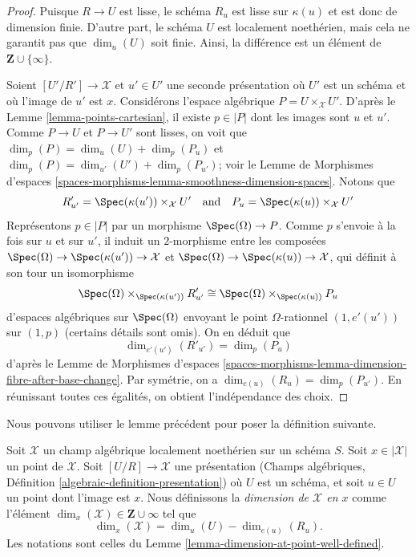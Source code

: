 \begin{proof}
Puisque $R \to U$ est lisse, le schéma $R_u$ est lisse sur $\kappa(u)$
et est donc de dimension finie. D'autre part, le schéma $U$
est localement noethérien, mais cela ne garantit pas que
$\dim_u(U)$ soit finie. Ainsi, la différence est un élément de
$\mathbf{Z} \cup \{\infty\}$.

\medskip\noindent
Soient $[U'/R'] \to \mathcal{X}$ et $u' \in U'$ une seconde présentation
où $U'$ est un schéma et où l'image de $u'$ est $x$. Considérons l'espace
algébrique $P = U \times_\mathcal{X} U'$. D'après le
Lemme \ref{lemma-points-cartesian}, il existe $p \in |P|$ dont les images sont
$u$ et $u'$. Comme $P \to U$ et $P \to U'$ sont lisses, on voit que
$\dim_p(P) = \dim_u(U) + \dim_p(P_u)$ et
$\dim_p(P) = \dim_{u'}(U') + \dim_p(P_{u'})$; voir le
Lemme de Morphismes d'espaces
\ref{spaces-morphisms-lemma-smoothness-dimension-spaces}.
Notons que
$$
R'_{u'} = \Spec(\kappa(u')) \times_\mathcal{X} U'
\quad\text{and}\quad
P_u = \Spec(\kappa(u)) \times_\mathcal{X} U'
$$
Représentons $p \in |P|$ par un morphisme $\Spec(\Omega) \to P$.
Comme $p$ s'envoie à la fois sur $u$ et sur $u'$, il induit un $2$-morphisme
entre les composées
$\Spec(\Omega) \to \Spec(\kappa(u')) \to \mathcal{X}$ et
$\Spec(\Omega) \to \Spec(\kappa(u)) \to \mathcal{X}$,
qui définit à son tour un isomorphisme
$$
\Spec(\Omega) \times_{\Spec(\kappa(u'))} R'_{u'}
\cong
\Spec(\Omega) \times_{\Spec(\kappa(u))} P_u
$$
d'espaces algébriques sur $\Spec(\Omega)$ envoyant le point $\Omega$-rationnel
$(1, e'(u'))$ sur $(1, p)$ (certains détails sont omis). On en déduit que
$$
\dim_{e'(u')}(R'_{u'}) = \dim_p(P_u)
$$
d'après le Lemme de Morphismes d'espaces
\ref{spaces-morphisms-lemma-dimension-fibre-after-base-change}.
Par symétrie, on a
$\dim_{e(u)}(R_u) = \dim_p(P_{u'})$.
En réunissant toutes ces égalités, on obtient l'indépendance des choix.
\end{proof}

\noindent
Nous pouvons utiliser le lemme précédent pour poser la définition suivante.

\begin{definition}
\label{definition-dimension-at-point}
Soit $\mathcal{X}$ un champ algébrique localement noethérien sur un schéma $S$.
Soit $x \in |\mathcal{X}|$ un point de $\mathcal{X}$.
Soit $[U/R] \to \mathcal{X}$ une présentation
(Champs algébriques, Définition \ref{algebraic-definition-presentation})
où $U$ est un schéma,
et soit $u \in U$ un point dont l'image est $x$.
Nous définissons la {\it dimension de $\mathcal{X}$ en $x$} comme
l'élément $\dim_x(\mathcal{X}) \in \mathbf{Z} \cup \infty$
tel que 
$$
\dim_x(\mathcal{X}) = \dim_u(U)-\dim_{e(u)}(R_u).
$$
Les notations sont celles du Lemme \ref{lemma-dimension-at-point-well-defined}.
\end{definition}

